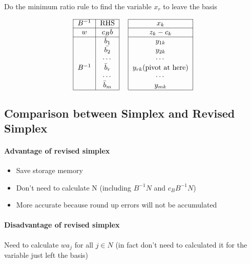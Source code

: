                 Do the minimum ratio rule to find the variable $x_r$ to leave the basis

                \begin{align}
                    \begin{tabular}{|c|c|c|c|}  
                        \cline{1-2} \cline{4-4} $B^{-1}$ & RHS & & $x_k$ \\
                        \cline{1-2} \cline{4-4} $w$ & $c_B\bar{b}$ & & $z_k-c_k$ \\
                        \cline{1-2} \cline{4-4} & $\bar{b}_1$ & & $y_{1k}$\\
                        & $\bar{b_2}$ & & $y_{2k}$\\
                        & $\cdots$ & & $\cdots$\\
                        $B^{-1}$ & $\bar{b}_r$ & & $y_{rk}$(pivot at here)\\
                        & $\cdots$ & & $\cdots$\\
                        & $\bar{b}_m$ & & $y_{mk}$\\
                        \cline{1-2} \cline{4-4} 
                    \end{tabular} \nonumber
                \end{align}

            \subsection{Comparison between Simplex and Revised Simplex}
                \paragraph{Advantage of revised simplex}
                    \begin{itemize}
                        \item Save storage memory
                        \item Don\rq{}t need to calculate N (including $B^{-1}N$ and $c_BB^{-1}N$)
                        \item More accurate because round up errors will not be accumulated 
                    \end{itemize}

                \paragraph{Disadvantage of revised simplex}
                    Need to calculate $wa_j$ for all $j \in N$ (in fact don\rq{}t need to calculated it for the variable just left the basis) 


